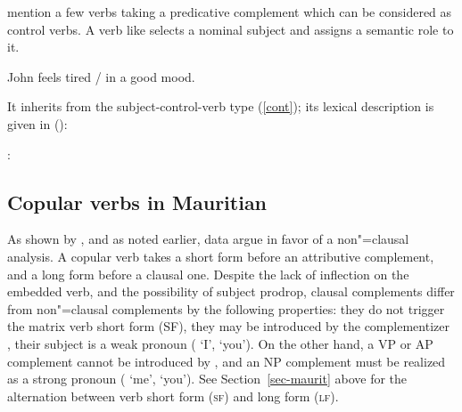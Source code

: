 \citet{PollardandSag1994}\addpages mention a few verbs taking a predicative complement which can be
considered as control verbs. A verb like  selects a nominal subject and assigns a
semantic role to it.

\begin{exe}
\ex John feels tired / in a good mood.
\end{exe}

\noindent
It inherits from the subject-control-verb type (\ref{cont}); its lexical description is given in ():

\eas
{}:\\
\zs


\subsection{Copular verbs in Mauritian}

As shown by \citet{HenriandLaurens2011}, and as noted earlier,  data
argue in favor
of a non"=clausal analysis. A copular verb takes a short form before an
attributive complement, and
a long form before a clausal one. Despite the lack of inflection on the embedded verb, and the
possibility of subject prodrop, clausal complements differ from non"=clausal complements by the
following properties: they do not trigger the matrix verb short form (SF), they may be introduced by
the complementizer , their subject is a weak pronoun ( `I',  `you'). On
the other hand, a VP or AP complement cannot be introduced by , and an NP complement must
be realized as a strong pronoun ( `me',  `you'). See Section~\ref{sec-maurit}
above for the alternation between verb short form (\textsc{sf}) and long form (\textsc{lf}).

